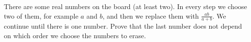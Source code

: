 There are some real numbers on the board (at least two). In every step we choose two of them, for example $a$ and $b$,  and then we replace them with $\frac{ab}{a+b}$. We continue until there is one number. Prove that the last number does not depend on which order we choose the numbers to erase.